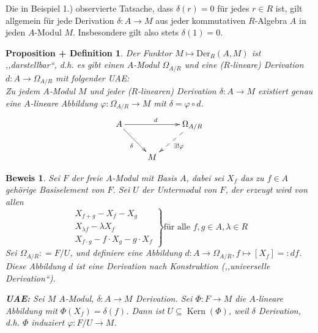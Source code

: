 \documentclass[a4paper,12pt]{scrbook}
\theoremstyle{break}
\newtheorem{PropDef}[Def]{Proposition + Definition}
\theoremstyle{nonumberbreak}
\newtheorem{Bew}{Beweis}
\theoremstyle{nonumberplain}
\newcommand{\defeqr}[0]{\mathrel{\mathop:}=}
\newcommand{\defeql}[0]{=\mathrel{\mathop:}}
\DeclareMathOperator{\Kern}{Kern}
\begin{document}
Die in Beispiel 1.) observierte Tatsache, dass $\delta\left(r\right) = 0$ für jedes $r\in R$ ist,
gilt allgemein für jede Derivation $\delta : A \to M$ aus jeder kommutativen $R$-Algebra $A$
in jeden $A$-Modul $M$. Insbesondere gilt also stets $\delta\left(1\right) = 0$.

\begin{PropDef} \label{1.21}
  Der Funktor $M \mapsto \mbox{Der}_R(A,M)$ ist ,,darstellbar``, d.h. es gibt
  einen $A$-Modul $\Omega_{A/R}$ und eine ($R$-lineare) Derivation $d: A \to \Omega_{A/R}$ mit
  folgender UAE:\\
  Zu jedem $A$-Modul $M$ und jeder ($R$-linearen) Derivation $\delta: A \to M$
  existiert genau eine $A$-lineare Abbildung $\varphi: \Omega_{A/R} \to M$ mit
  $\delta = \varphi \circ d$.
  \[
    \begin{xy}
      \xymatrix{
         A \ar[rr]^{d} \ar[rd]_{\delta}  &     &  \Omega_{A/R} \ar@{-->}[dl]^{\exists!\varphi}  \\
                                         &  M  &
      }
    \end{xy}
  \]
\end{PropDef}

\begin{Bew}
  Sei $F$ der freie $A$-Modul mit Basis $A$, dabei sei $X_f$ das zu $f \in A$
  gehörige Basiselement von $F$.
  Sei $U$ der Untermodul von $F$, der erzeugt wird von allen
  \[\left. \begin{array}{l}
       X_{f+g} - X_f - X_g\\
       X_{\lambda f} - \lambda X_f\\
       X_{f \cdot g} - f \cdot X_g - g \cdot X_f
     \end{array} \right\} \text{für alle } f,g \in A, \lambda \in R\]
  Sei $\Omega_{A/R} \defeqr F/U$, und definiere eine Abbildung
  $d: A \to \Omega_{A/R}, f \mapsto [X_f] \defeql d f$. Diese Abbildung $d$
   ist eine Derivation nach Konstruktion (,,universelle Derivation``).

  \textbf{UAE:} Sei $M$ $A$-Modul, $\delta: A \to M$ Derivation. Sei $\Phi: F \to
  M$ die $A$-lineare Abbildung mit $\Phi(X_f) = \delta(f)$. Dann ist $U \subseteq
  \Kern(\Phi)$, weil $\delta$ Derivation, d.h. $\Phi$ induziert $\varphi:
  F/U \to M$.
\end{Bew}
\end{document}
